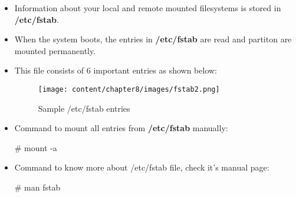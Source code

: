 \setlength{\columnsep}{3pt}
\begin{flushleft}
	
\begin{itemize}
	\item Information about your local and remote mounted filesystems is stored in \textbf{/etc/fstab}.
	\item When the system boots, the entries in \textbf{/etc/fstab} are read and partiton are mounted permanently.
	\item This file consists of 6 important entries as shown below:
	
	\begin{figure}[h!]
		\centering
		\texttt{[image: content/chapter8/images/fstab2.png]}
		\caption{Sample /etc/fstab entries}
		\label{fstab}
	\end{figure}	
	
	\item Command to mount all entries from \textbf{/etc/fstab} manually:
	\bigskip
	\begin{tcolorbox}[breakable,notitle,boxrule=-0pt,colback=black,colframe=black]
		\color{green}
		\font=9pt
		\# mount -a
		\font=4pt
	\end{tcolorbox}
	
	\item Command to know more about /etc/fstab file, check it's manual page:
	\begin{tcolorbox}[breakable,notitle,boxrule=-0pt,colback=black,colframe=black]
		\color{green}
		\font=9pt
		\# man fstab
		\font=4pt
	\end{tcolorbox}
	
\end{itemize}

\newpage

\end{flushleft}
